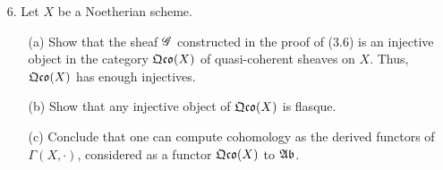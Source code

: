 \documentclass{article}
\begin{document}
\begin{enumerate} [label=\textbf{\arabic*.}, leftmargin=0em]
\begin{proof}
  Suppose $X = \spec{A}$ is affine for some reduced Noetherian ring $A$.
  The irreducible components of $X$ correspond to the minimal prime ideals $\goth{p}$ of $A$ (A.M. Ex. 1.20).
  In particular, the irreducible components of $X$ are precisely $\spec{A / \goth{p}}$.
  Conversely, let $X_i$ be the irreducible components of $X$, and let $\phi : \fF \to \bigoplus_i j_* \restr{\fF}{X_i}$ be the natural map of $\fO_X$-modules, where $j : X_i \hookrightarrow X$ is the inclusion.
  Since $X$ is Noetherian, $X_i \cap X_j$ is quasi-compact, so we can cover it with a finite number of open affine subsets $X_{ijk}$.
  Because $X$ is reduced, $\phi$ is injective, so we can extend $\phi$ by the following exact sequence
  \[ \begin{tikzcd}
    0 \arrow[r] & \fF \arrow[r] & \bigoplus_i j_* \restr{\fF}{X_i} \arrow[r] & \bigoplus_{i,j} j_* \restr{\fF}{X_{ijk}}.
  \end{tikzcd} \]
  Each $j_* \restr{\fF}{X_i}, j_* \restr{\fF}{X_{ijk}}$ has vanishing cohomology for $i > 0$ by (2.10), (3.5), and (3.7).
  While the sequence above is not surjective on the right, the image is still a quasi-coherent sheaf, so using the long exact sequence of cohomology, we deduce that $H^i(X, \fF) = 0$ for $i > 0$.
  Hence, $X$ is affine by (3.7).
\end{proof}

\item[6.] Let $X$ be a Noetherian scheme.
\begin{itemize}
  \item[(a)] Show that the sheaf $\mathscr{G}$ constructed in the proof of (3.6) is an injective object in the category $\mathfrak{Qco}(X)$ of quasi-coherent sheaves on $X$.
  Thus, $\mathfrak{Qco}(X)$ has enough injectives.

  \item[(b)] Show that any injective object of $\mathfrak{Qco}(X)$ is flasque.

  \item[(c)] Conclude that one can compute cohomology as the derived functors of $\Gamma(X, \cdot)$, considered as a functor $\mathfrak{Qco}(X)$ to $\mathfrak{Ab}$.
\end{itemize}


\end{enumerate}
\end{document}
